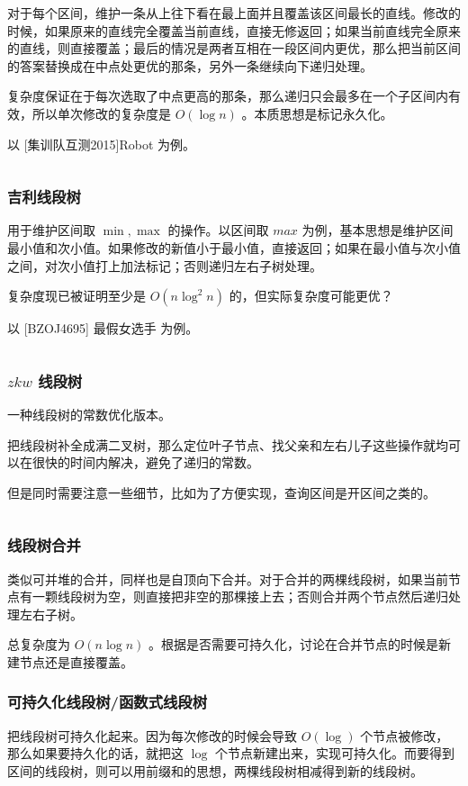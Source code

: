 \documentclass[UTF-8]{ctexart}
\newcommand{\cpp}[1]{\inputminted[bgcolor=bg,breaklines,breakanywhere=true]{c++}{#1}}
\begin{document}
			对于每个区间，维护一条从上往下看在最上面并且覆盖该区间最长的直线。修改的时候，如果原来的直线完全覆盖当前直线，直接无修返回；如果当前直线完全原来的直线，则直接覆盖；最后的情况是两者互相在一段区间内更优，那么把当前区间的答案替换成在中点处更优的那条，另外一条继续向下递归处理。
	
			复杂度保证在于每次选取了中点更高的那条，那么递归只会最多在一个子区间内有效，所以单次修改的复杂度是 $O(\log n)$ 。本质思想是标记永久化。
		
			以 [集训队互测2015]Robot 为例。
			\cpp{code/Example/BZOJ3938.cpp}
			\subsubsection{吉利线段树}
			用于维护区间取 $\min,\max$ 的操作。以区间取 $max$ 为例，基本思想是维护区间最小值和次小值。如果修改的新值小于最小值，直接返回；如果在最小值与次小值之间，对次小值打上加法标记；否则递归左右子树处理。
	
			复杂度现已被证明至少是 $O(n\log^2 n)$ 的，但实际复杂度可能更优？
			
			以 [BZOJ4695] 最假女选手 为例。
			\cpp{code/Example/BZOJ4695.cpp}
			\subsubsection{$zkw$ 线段树}
			一种线段树的常数优化版本。
	
			把线段树补全成满二叉树，那么定位叶子节点、找父亲和左右儿子这些操作就均可以在很快的时间内解决，避免了递归的常数。
	
			但是同时需要注意一些细节，比如为了方便实现，查询区间是开区间之类的。
			\cpp{code/DataStruct/zkw.cpp}
			\subsubsection{线段树合并}
			类似可并堆的合并，同样也是自顶向下合并。对于合并的两棵线段树，如果当前节点有一颗线段树为空，则直接把非空的那棵接上去；否则合并两个节点然后递归处理左右子树。
	
			总复杂度为 $O(n \log n)$ 。根据是否需要可持久化，讨论在合并节点的时候是新建节点还是直接覆盖。
			\subsubsection{可持久化线段树/函数式线段树}
			把线段树可持久化起来。因为每次修改的时候会导致 $O(\log)$ 个节点被修改，那么如果要持久化的话，就把这 $\log$ 个节点新建出来，实现可持久化。而要得到区间的线段树，则可以用前缀和的思想，两棵线段树相减得到新的线段树。
	
\end{document}
